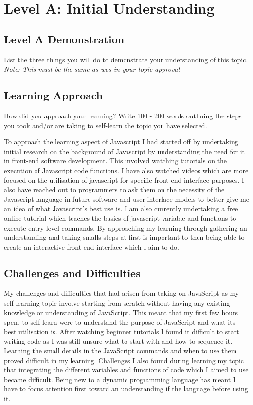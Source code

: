 \documentclass[a4paper, 11pt]{report}
\begin{document}
\tableofcontents



\newpage
\section{Level A: Initial Understanding}
\vspace{5mm}
\subsection{Level A Demonstration}
List the three things you will do to demonstrate your understanding of this topic.
\textit{Note: This must be the same as was in your topic approval}

\subsection{Learning Approach}
How did you approach your learning? Write 100 - 200 words outlining the steps you took and/or are taking to self-learn the topic you have selected.

To approach the learning aspect of Javascript I had started off by undertaking initial research on the background of Javascript by understanding the need for it in front-end software development. This involved watching tutorials on the execution of Javascript code functions. I have also watched videos which are more focused on the utilisation of javascript for specific front-end interface purposes. I also have reached out to programmers to ask them on the necessity of the Javascript language in future software and user interface models to better give me an idea of what Javascript's best use is. I am also currently undertaking a free online tutorial which teaches the basics of javascript variable and functions to execute entry level commands. By approaching my learning through gathering an understanding and taking smalls steps at first is important to then being able to create an interactive front-end interface which I aim to do.

\subsection{Challenges and Difficulties}
My challenges and difficulties that had arisen from taking on JavaScript as my self-learning topic involve starting from scratch without having any existing knowledge or understanding of JavaScript. This meant that my first few hours spent to self-learn were to understand the purpose of JavaScript and what its best utilisation is. After watching beginner tutorials I found it difficult to start writing code as I was still unsure what to start with and how to sequence it. Learning the small details in the JavaScript commands and when to use them proved difficult in my learning. Challenges I also found during learning my topic that integrating the different variables and functions of code which I aimed to use became difficult. Being new to a dynamic programming language has meant I have to focus attention first toward an understanding if the language before using it. 
\end{document}
